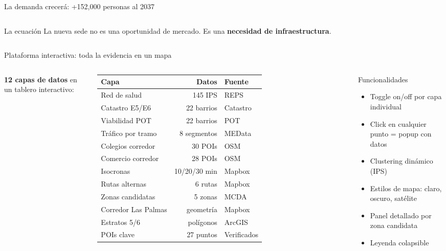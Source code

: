 \documentclass[aspectratio=169, 11pt]{beamer}
\begin{document}
\begin{frame}{La demanda crecerá: +152,000 personas al 2037}
\begin{columns}[T]
\begin{alertblock}{\small La ecuación}
\vspace{4pt}
La nueva sede no es una oportunidad de mercado. Es una \textbf{necesidad de infraestructura}.
\end{alertblock}
\end{columns}
\end{frame}

\begin{frame}{Plataforma interactiva: toda la evidencia en un mapa}

\begin{columns}[T]
\textbf{12 capas de datos} en un tablero interactivo:

\vspace{6pt}
{\footnotesize
\begin{tabular}{@{}lrl@{}}
\toprule
\textbf{Capa} & \textbf{Datos} & \textbf{Fuente} \\
\midrule
Red de salud & 145 IPS & REPS \\
Catastro E5/E6 & 22 barrios & Catastro \\
Viabilidad POT & 22 barrios & POT \\
Tráfico por tramo & 8 segmentos & MEData \\
Colegios corredor & 30 POIs & OSM \\
Comercio corredor & 28 POIs & OSM \\
Isocronas & 10/20/30 min & Mapbox \\
Rutas alternas & 6 rutas & Mapbox \\
Zonas candidatas & 5 zonas & MCDA \\
Corredor Las Palmas & geometría & Mapbox \\
Estratos 5/6 & polígonos & ArcGIS \\
POIs clave & 27 puntos & Verificados \\
\bottomrule
\end{tabular}
}

\vspace{6pt}
\begin{block}{\small Funcionalidades}
\footnotesize
\begin{itemize}
  \item Toggle on/off por capa individual
  \item Click en cualquier punto = popup con datos
  \item Clustering dinámico (IPS)
  \item Estilos de mapa: claro, oscuro, satélite
  \item Panel detallado por zona candidata
  \item Leyenda colapsible
\end{itemize}
\end{block}


\end{columns}
\end{frame}
\end{document}
